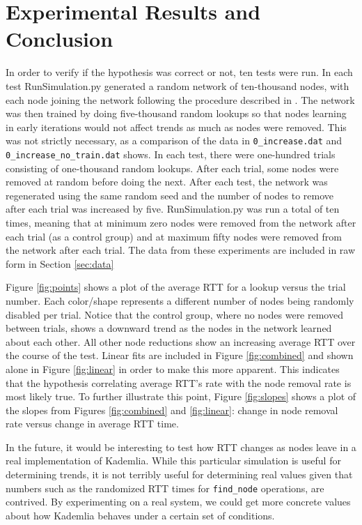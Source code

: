 \documentclass[notitlepage,12pt]{article}
\begin{document}
\section{Experimental Results and Conclusion}
\label{sec:expres}

In order to verify if the hypothesis was correct or not, ten tests were run. In
each test RunSimulation.py generated a random network of ten-thousand nodes,
with each node joining the network following the procedure described in
\cite{kademlia}. The network was then trained by doing five-thousand random
lookups so that nodes learning in early iterations would not affect trends as
much as nodes were removed. This was not strictly necessary, as a comparison of
the data in \texttt{0\_increase.dat} and \texttt{0\_increase\_no\_train.dat} shows.
In each test, there were one-hundred trials consisting of
one-thousand random lookups. After each trial, some nodes were removed at random
before doing the next. After each test, the network was regenerated using the
same random seed and the number of nodes to remove after each trial was
increased by five. RunSimulation.py was run a total of ten times, meaning that
at minimum zero nodes were removed from the network after each trial (as a
control group) and at maximum fifty nodes were removed from the network after
each trial. The data from these experiments are included in raw form in Section \ref{sec:data}

Figure \ref{fig:points} shows a plot of the average RTT for a lookup versus the
trial number. Each color/shape represents a different number of nodes being
randomly disabled per trial. Notice that the control group, where no nodes were
removed between trials, shows a downward trend as the nodes in the network
learned about each other. All other node reductions show an increasing average
RTT over the course of the test. Linear fits are included in Figure
\ref{fig:combined} and shown alone in Figure \ref{fig:linear} in order to make this
more apparent. This indicates that the hypothesis correlating average RTT's rate
with the node removal rate is most likely true. To further illustrate this
point, Figure \ref{fig:slopes} shows a plot of the slopes from Figures
\ref{fig:combined} and \ref{fig:linear}: change in node removal rate versus
change in average RTT time.

In the future, it would be interesting to test how RTT changes as nodes leave in
a real implementation of Kademlia. While this particular simulation is useful
for determining trends, it is not terribly useful for determining real values
given that numbers such as the randomized RTT times for \texttt{find\_node}
operations, are contrived. By experimenting on a real system, we could get more
concrete values about how Kademlia behaves under a certain set of conditions. 
\end{document}
